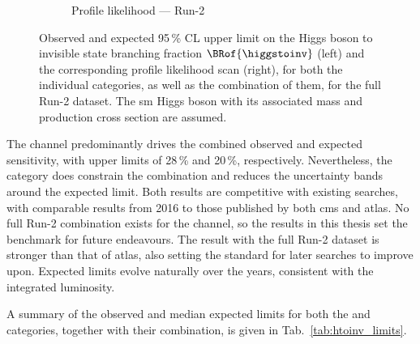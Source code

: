 \begin{figure}[htbp]
\begin{subfigure}[t]{0.45\textwidth}
        \caption{Profile likelihood --- Run-2}
    \end{subfigure}
    \caption[Observed and expected 95\,\% CL upper limit on the Higgs boson to invisible state branching fraction $\BRof{\higgstoinv}$ and the corresponding profile likelihood scan, for both the individual categories, as well as the combination of them, for the full Run-2 dataset]{Observed and expected 95\,\% CL upper limit on the Higgs boson to invisible state branching fraction $\BRof{\higgstoinv}$ (left) and the corresponding profile likelihood scan (right), for both the individual categories, as well as the combination of them, for the full Run-2 dataset. The \acrlong{sm} Higgs boson with its associated mass and production cross section are assumed.}
    \label{fig:htoinv_limit_likelihood_Run2_per_cat}
\end{figure}

The \VH channel predominantly drives the combined observed and expected sensitivity, with upper limits of 28\,\% and 20\,\%, respectively. Nevertheless, the \ttH category does constrain the combination and reduces the uncertainty bands around the expected limit. Both results are competitive with existing searches, with comparable results from 2016 to those published by both \acrshort{cms} and \acrshort{atlas}. No full Run-2 combination exists for the \VH channel, so the results in this thesis set the benchmark for future endeavours. The \ttH result with the full Run-2 dataset is stronger than that of \acrshort{atlas}, also setting the standard for later searches to improve upon. Expected limits evolve naturally over the years, consistent with the integrated luminosity.

A summary of the observed and median expected limits for both the \ttH and \VH categories, together with their combination, is given in Tab.~\ref{tab:htoinv_limits}.

